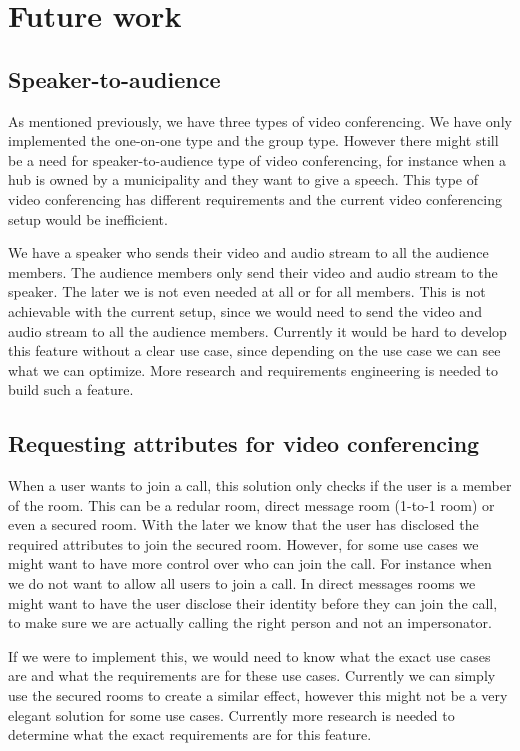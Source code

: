 \documentclass{report}
\begin{document}
\chapter{Future work}
\section{Speaker-to-audience}
As mentioned previously, we have three types of video conferencing. We have only implemented the one-on-one type and
the group type. However there might still be a need for speaker-to-audience type of video conferencing, for instance
when a hub is owned by a municipality and they want to give a speech. This type of video conferencing has different
requirements and the current video conferencing setup would be inefficient.

We have a speaker who sends their video and audio stream to all the audience members. The audience members only send
their video and audio stream to the speaker. The later we is not even needed at all or for all members. This is not
achievable with the current setup, since we would need to send the video and audio stream to all the audience members.
Currently it would be hard to develop this feature without a clear use case, since depending on the use case we can
see what we can optimize. More research and requirements engineering is needed to build such a feature.

\section{Requesting attributes for video conferencing}
When a user wants to join a call, this solution only checks if the user is a member of the room. This can be a
redular room, direct message room (1-to-1 room) or even a secured room. With the later we know that the user has
disclosed the required attributes to join the secured room. However, for some use cases we might want to have more
control over who can join the call. For instance when we do not want to allow all users to join a call. In direct
messages rooms we might want to have the user disclose their identity before they can join the call, to
make sure we are actually calling the right person and not an impersonator.

If we were to implement this, we would need to know what the exact use cases are and what the requirements are for
these use cases. Currently we can simply use the secured rooms to create a similar effect, however this might not be
a very elegant solution for some use cases. Currently more research is needed to determine what the exact requirements
are for this feature.

\newpage


\end{document}
